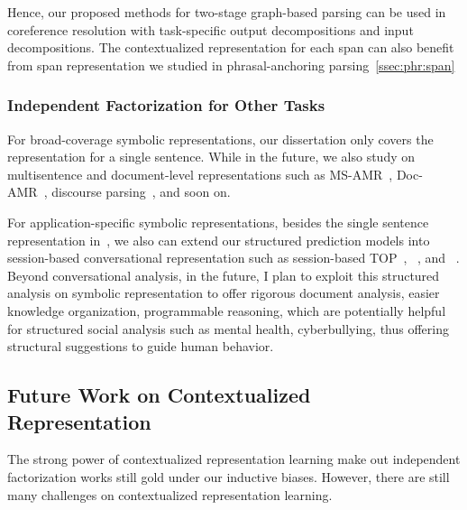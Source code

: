 Hence, our proposed methods for two-stage graph-based parsing can be
used in coreference resolution with task-specific output
decompositions and input decompositions. The contextualized
representation for each span can also benefit from span representation
we studied in phrasal-anchoring parsing~\autoref{ssec:phr:span}

\subsubsection{Independent Factorization for Other Tasks}
\label{sssec:future:other-tasks}

For broad-coverage symbolic representations, our dissertation only
covers the representation for a single sentence. While in the future,
we also study on multisentence and document-level representations
such as MS-AMR~\cite{ogorman-etal-2018-amr},
Doc-AMR~\cite{naseem-etal-2022-docamr}, discourse
parsing~\cite{carlson-etal-2001-building}, and soon on.

For application-specific symbolic representations, besides the single
sentence representation
in~\cite[TOP,][]{gupta-etal-2018-semantic-parsing}, we also can extend
our structured prediction models into session-based conversational
representation such as session-based
TOP~\cite{aghajanyan2020conversational},
~\cite[TreeDST,][]{cheng2020conversational}, and
~\cite[Dataflow,][]{andreas2020task}.  Beyond conversational analysis,
in the future, I plan to exploit this structured analysis on symbolic
representation to offer rigorous document analysis, easier knowledge
organization, programmable reasoning, which are potentially helpful
for structured social analysis such as mental health, cyberbullying,
thus offering structural suggestions to guide human behavior.

\subsection{Future Work on Contextualized Representation}
\label{ssec:future:contextual-rep}
The strong power of
contextualized representation learning make out independent
factorization works still gold under our inductive biases. However,
there are still many challenges on contextualized representation
learning.

